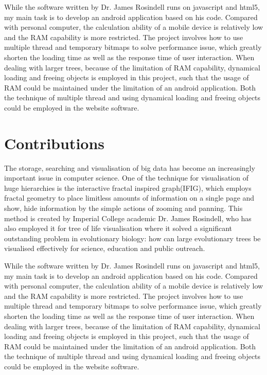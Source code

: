 \documentclass[MSc]{icldt}
\begin{document}
While the software written by Dr. James Rosindell runs on javascript and html5, my main task is to develop an android application based on his code. Compared with personal computer, the calculation ability of a mobile device is relatively low and the RAM capability is more restricted. The project involves how to use multiple thread and temporary bitmaps to solve performance issue, which greatly shorten the loading time as well as the response time of user interaction. When dealing with larger trees, because of the limitation of RAM capability, dynamical loading and freeing objects is employed in this project, such that the usage of RAM could be maintained under the limitation of an android application. 
Both the technique of multiple thread and using dynamical loading and freeing objects could be employed in the website software.


\section{Contributions}

The storage, searching and visualisation of big data has become an increasingly important issue in computer science. One of the technique for visualisation of huge hierarchies is the interactive fractal inspired graph(IFIG), which employs fractal geometry to place limitless amounts of information on a single page and show, hide information by the simple actions of zooming and panning. This method is created by Imperial College academic Dr. James Rosindell, who has also employed it for tree of life visualisation where it solved a significant outstanding problem in evolutionary biology: how can large evolutionary trees be visualised effectively for science, education and public outreach.

While the software written by Dr. James Rosindell runs on javascript and html5, my main task is to develop an android application based on his code. Compared with personal computer, the calculation ability of a mobile device is relatively low and the RAM capability is more restricted. The project involves how to use multiple thread and temporary bitmaps to solve performance issue, which greatly shorten the loading time as well as the response time of user interaction. When dealing with larger trees, because of the limitation of RAM capability, dynamical loading and freeing objects is employed in this project, such that the usage of RAM could be maintained under the limitation of an android application. 
Both the technique of multiple thread and using dynamical loading and freeing objects could be employed in the website software.
\end{document}
